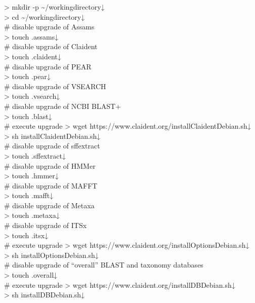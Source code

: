 \documentclass[titlepage,10pt,a4paper,english]{jsbook}
\newenvironment{cmd}{\begin{oframed}\raggedright\ttfamily\footnotesize\setlength{\baselineskip}{1.4em}}{\end{oframed}\vspace{-1em}}
\begin{document}
\begin{cmd}
{\textgreater} mkdir -p {\textasciitilde}/workingdirectory↓\\
{\textgreater} cd {\textasciitilde}/workingdirectory↓\\
\# disable upgrade of Assams\\
{\textgreater} touch .assams↓\\
\# disable upgrade of Claident\\
{\textgreater} touch .claident↓\\
\# disable upgrade of PEAR\\
{\textgreater} touch .pear↓\\
\# disable upgrade of VSEARCH\\
{\textgreater} touch .vsearch↓\\
\# disable upgrade of NCBI BLAST+\\
{\textgreater} touch .blast↓\\
\# execute upgrade
{\textgreater} wget https://www.claident.org/installClaident{\textunderscore}Debian.sh↓\\
{\textgreater} sh installClaident{\textunderscore}Debian.sh↓\\
\# disable upgrade of sff{\textunderscore}extract\\
{\textgreater} touch .sffextract↓\\
\# disable upgrade of HMMer\\
{\textgreater} touch .hmmer↓\\
\# disable upgrade of MAFFT\\
{\textgreater} touch .mafft↓\\
\# disable upgrade of Metaxa\\
{\textgreater} touch .metaxa↓\\
\# disable upgrade of ITSx\\
{\textgreater} touch .itsx↓\\
\# execute upgrade
{\textgreater} wget https://www.claident.org/installOptions{\textunderscore}Debian.sh↓\\
{\textgreater} sh installOptions{\textunderscore}Debian.sh↓\\
\# disable upgrade of ``overall'' BLAST and taxonomy databases\\
{\textgreater} touch .overall↓\\
\# execute upgrade
{\textgreater} wget https://www.claident.org/installDB{\textunderscore}Debian.sh↓\\
{\textgreater} sh installDB{\textunderscore}Debian.sh↓\\

\end{cmd}
\end{document}
